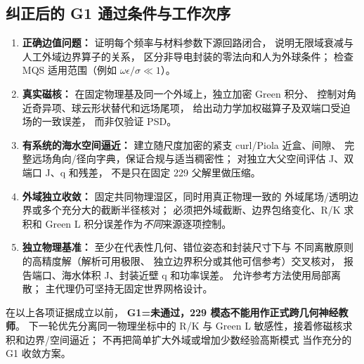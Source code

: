 \subsection{纠正后的 G1 通过条件与工作次序}
\begin{enumerate}
\item \textbf{正确边值问题：}
证明每个频率与材料参数下源回路闭合，
说明无限域衰减与人工外域边界算子的关系，
区分非导电封装的零法向和人为外球条件；
检查 MQS 适用范围（例如 \(\omega\epsilon/\sigma\ll1\)）。
\item \textbf{真实磁核：}
在固定物理基及同一个外域上，独立加密 Green 积分、
控制对角近奇异项、球云形状替代和远场尾项，
给出动力学加权磁算子及双端口受迫场的一致误差，
而非仅验证 PSD。
\item \textbf{有系统的海水空间逼近：}
建立随尺度加密的紧支 curl/Piola 近盒、间隙、
完整远场角向/径向字典，保证合规与适当稠密性；
对独立大父空间评估 J、双端口 J、q 和残差，
不是只在固定 229 父解里做压缩。
\item \textbf{外域独立收敛：}
固定共同物理湿区，同时用真正物理一致的
外域尾场/透明边界或多个充分大的截断半径核对；
必须把外域截断、边界包络变化、R/K 求积和 Green L
积分误差作为\emph{不同}来源逐项控制。
\item \textbf{独立物理基准：}
至少在代表性几何、错位姿态和封装尺寸下与
不同离散原则的高精度解（解析可用极限、
独立边界积分或其他可信参考）交叉核对，
报告端口、海水体积 J、封装近壁 q 和功率误差。
允许参考方法使用局部离散；
主代理仍可坚持无固定世界网格设计。
\end{enumerate}
在以上各项证据成立以前，
\textbf{G1=未通过，229 模态不能用作正式跨几何神经教师}。
下一轮优先分离同一物理坐标中的 R/K 与 Green L
敏感性，接着修磁核求积和边界/空间逼近；
不再把简单扩大外域或增加少数经验高斯模式
当作充分的 G1 收敛方案。
